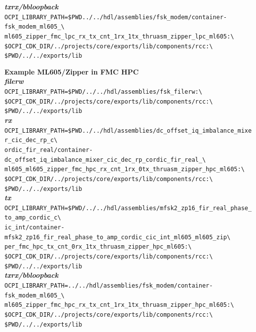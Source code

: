 \noindent\textbf{\textit{txrx/bbloopback}}\\
\verb|OCPI_LIBRARY_PATH=$PWD../../hdl/assemblies/fsk_modem/container-fsk_modem_ml605_\| \\
\verb|ml605_zipper_fmc_lpc_rx_tx_cnt_1rx_1tx_thruasm_zipper_lpc_ml605:\| \\
\verb|$OCPI_CDK_DIR/../projects/core/exports/lib/components/rcc:\| \\
\verb|$PWD/../../exports/lib| \\
\par\medskip

\noindent\textbf{Example ML605/Zipper in FMC HPC}\\
\noindent\textbf{\textit{filerw}}\\
\verb|OCPI_LIBRARY_PATH=$PWD/../../hdl/assemblies/fsk_filerw:\| \\
\verb|$OCPI_CDK_DIR/../projects/core/exports/lib/components/rcc:\| \\
\verb|$PWD/../../exports/lib| \\

\noindent\textbf{\textit{rx}}\\
\verb|OCPI_LIBRARY_PATH=$PWD../../hdl/assemblies/dc_offset_iq_imbalance_mixer_cic_dec_rp_c\| \\
\verb|ordic_fir_real/container-dc_offset_iq_imbalance_mixer_cic_dec_rp_cordic_fir_real_\| \\
\verb|ml605_ml605_zipper_fmc_hpc_rx_cnt_1rx_0tx_thruasm_zipper_hpc_ml605:\| \\
\verb|$OCPI_CDK_DIR/../projects/core/exports/lib/components/rcc:\| \\
\verb|$PWD/../../exports/lib| \\

\noindent\textbf{\textit{tx}}\\
\verb|OCPI_LIBRARY_PATH=$PWD/../../hdl/assemblies/mfsk2_zp16_fir_real_phase_to_amp_cordic_c\| \\
\verb|ic_int/container-mfsk2_zp16_fir_real_phase_to_amp_cordic_cic_int_ml605_ml605_zip\| \\
\verb|per_fmc_hpc_tx_cnt_0rx_1tx_thruasm_zipper_hpc_ml605:\| \\
\verb|$OCPI_CDK_DIR/../projects/core/exports/lib/components/rcc:\|\\
\verb|$PWD/../../exports/lib|\\

\noindent\textbf{\textit{txrx/bbloopback}}\\
\verb|OCPI_LIBRARY_PATH=../../hdl/assemblies/fsk_modem/container-fsk_modem_ml605_\| \\
\verb|ml605_zipper_fmc_hpc_rx_tx_cnt_1rx_1tx_thruasm_zipper_hpc_ml605:\| \\
\verb|$OCPI_CDK_DIR/../projects/core/exports/lib/components/rcc:\| \\
\verb|$PWD/../../exports/lib| \\
\pagebreak

